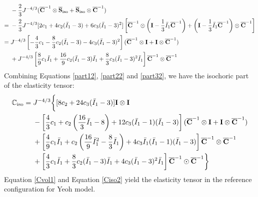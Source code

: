 \begin{equation} \label{part32}
\begin{split}
&-\frac{2}{3}J^{-4/3}({\overline{\bold{C}}}^{-1} \otimes {\overline{\bold{S}}}_\mathrm{iso} + {\overline{\bold{S}}}_\mathrm{iso} \otimes {\overline{{\bold{C}}}^{-1}})\\
= {} &
-\frac{2}{3}J^{-4/3}[2c_1 + 4c_2({\bar{I}}_1 - 3) + 6c_3({\bar{I}}_1 - 3)^2]
\left[{\overline{\bold{C}}}^{-1} \otimes \left(\bold{I} - \frac{1}{3}{\bar{I}_1}{\overline{\bold{C}}}^{-1}\right) + 
\left(\bold{I} - \frac{1}{3}{\bar{I}_1}{\overline{\bold{C}}}^{-1}\right) \otimes {\overline{\bold{C}}}^{-1}\right]\\
= {} &
J^{-4/3}  \left[-\frac{4}{3}c_1 - \frac{8}{3}c_2({\bar{I}}_1 - 3) - 4c_3({\bar{I}}_1 - 3)^2\right] ({\overline{\bold{C}}}^{-1} \otimes \bold{I} + \bold{I} \otimes {\overline{\bold{C}}}^{-1}) \\
&+ J^{-4/3}  \left[\frac{8}{9}c_1{\bar{I}}_1 + \frac{16}{9}c_2({\bar{I}}_1 - 3){\bar{I}}_1 + \frac{8}{3}c_3({\bar{I}}_1 - 3)^2{\bar{I}}_1 \right] {\overline{\bold{C}}}^{-1} \otimes {\overline{\bold{C}}}^{-1}
\end{split}
\end{equation}
Combining Equations \ref{part12}, \ref{part22} and \ref{part32}, we have the isochoric part of the elasticity tensor:
\begin{equation} \label{Ciso2}
\begin{split}
{\mathbb{C}}_\mathrm{iso} = {} & J^{-4/3} \bigg\{
[8c_2+24c_3({\bar{I}}_1 - 3)] \bold{I} \otimes \bold{I} \\
&- \left[\frac{4}{3}c_1 + c_2\left(\frac{16}{3}{\bar{I}}_1 - 8\right) + 12c_3({\bar{I}}_1 - 1)({\bar{I}}_1 - 3)\right]({\overline{\bold{C}}}^{-1} \otimes \bold{I} + \bold{I} \otimes {\overline{\bold{C}}}^{-1})\\
&+ \left[\frac{4}{9}c_1{\bar{I}}_1 + c_2\left(\frac{16}{9}{{\bar{I}}_1}^2 - \frac{8}{3}{\bar{I}}_1\right) + 4c_3{\bar{I}}_1({\bar{I}}_1 - 1)({\bar{I}}_1 - 3)\right] {\overline{\bold{C}}}^{-1} \otimes {\overline{\bold{C}}}^{-1} \\
&+ \left[\frac{4}{3}c_1{\bar{I}}_1 + \frac{8}{3}c_2({\bar{I}}_1 - 3){\bar{I}}_1 + 4c_3({\bar{I}}_1 - 3)^2{\bar{I}}_1\right]{\overline{\bold{C}}}^{-1} \odot {\overline{\bold{C}}}^{-1}
\bigg\}
\end{split}
\end{equation}
Equation \ref{Cvol1} and Equation \ref{Ciso2} yield the elasticity tensor in the reference configuration for Yeoh model.

